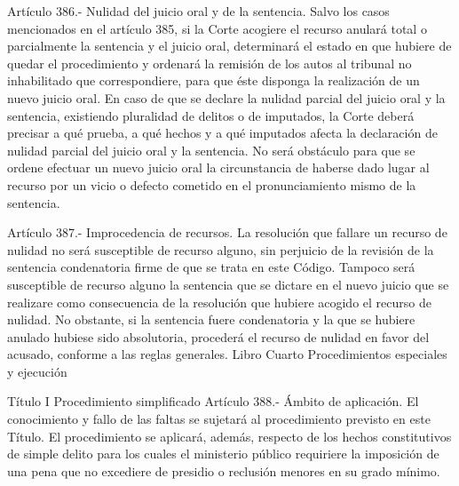     Artículo 386.- Nulidad del juicio oral y de la sentencia. Salvo los casos mencionados en el artículo 385, si la Corte acogiere el recurso anulará total o parcialmente la sentencia y el juicio oral, determinará el estado en que hubiere de quedar el procedimiento y ordenará la remisión de los autos al tribunal no inhabilitado que correspondiere, para que éste disponga la realización de un nuevo juicio oral.
    En caso de que se declare la nulidad parcial del juicio oral y la sentencia, existiendo pluralidad de delitos o de imputados, la Corte deberá precisar a qué prueba, a qué hechos y a qué imputados afecta la declaración de nulidad parcial del juicio oral y la sentencia.
    No será obstáculo para que se ordene efectuar un nuevo juicio oral la circunstancia de haberse dado lugar al recurso por un vicio o defecto cometido en el pronunciamiento mismo de la sentencia.

    Artículo 387.- Improcedencia de recursos. La resolución que fallare un recurso de nulidad no será susceptible de recurso alguno, sin perjuicio de la revisión de la sentencia condenatoria firme de que se trata en este Código.
    Tampoco será susceptible de recurso alguno la sentencia que se dictare en el nuevo juicio que se realizare como consecuencia de la resolución que hubiere acogido el recurso de nulidad. No obstante, si la sentencia fuere condenatoria y la que se hubiere anulado hubiese sido absolutoria, procederá el recurso de nulidad en favor del acusado, conforme a las reglas generales.
    Libro Cuarto
    Procedimientos especiales y ejecución

    Título I
    Procedimiento simplificado
    Artículo 388.- Ámbito de aplicación. El conocimiento y fallo de las faltas se sujetará al procedimiento previsto en este Título.
    El procedimiento se aplicará, además, respecto de los hechos constitutivos de simple delito para los cuales el ministerio público requiriere la imposición de una pena que no excediere de presidio o reclusión menores en su grado mínimo.

